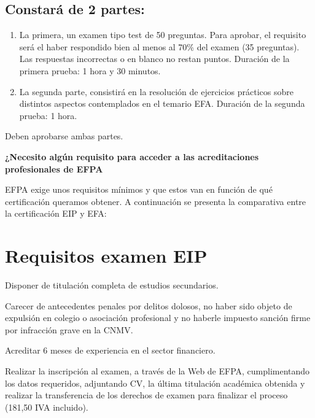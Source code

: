 \documentclass[
  letterpaper,
  DIV=11,
  numbers=noendperiod]{scrreprt}
\begin{document}

\hypertarget{constaruxe1-de-2-partes-1}{%
\subsection*{Constará de 2 partes:}\label{constaruxe1-de-2-partes-1}}

\begin{enumerate}
\def\labelenumi{\arabic{enumi}.}
\item
  La primera, un examen tipo test de 50 preguntas. Para aprobar, el
  requisito será el haber respondido bien al menos al 70\% del examen
  (35 preguntas). Las respuestas incorrectas o en blanco no restan
  puntos. Duración de la primera prueba: 1 hora y 30 minutos.
\item
  La segunda parte, consistirá en la resolución de ejercicios prácticos
  sobre distintos aspectos contemplados en el temario EFA. Duración de
  la segunda prueba: 1 hora.
\end{enumerate}

Deben aprobarse ambas partes.

\textbf{¿Necesito algún requisito para acceder a las acreditaciones
profesionales de EFPA}

EFPA exige unos requisitos mínimos y que estos van en función de qué
certificación queramos obtener. A continuación se presenta la
comparativa entre la certificación EIP y EFA:

\hypertarget{requisitos-examen-eip}{%
\section*{\texorpdfstring{\textbf{Requisitos examen
EIP}}{Requisitos examen EIP}}\label{requisitos-examen-eip}}


Disponer de titulación completa de estudios secundarios.

Carecer de antecedentes penales por delitos dolosos, no haber sido
objeto de expulsión en colegio o asociación profesional y no haberle
impuesto sanción firme por infracción grave en la CNMV.

Acreditar 6 meses de experiencia en el sector financiero.

Realizar la inscripción al examen, a través de la Web de EFPA,
cumplimentando los datos requeridos, adjuntando CV, la última titulación
académica obtenida y realizar la transferencia de los derechos de examen
para finalizar el proceso (181,50 IVA incluido).
\end{document}
